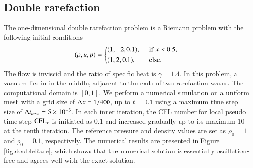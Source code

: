 


\subsection{Double rarefaction}

The one-dimensional double rarefaction problem \cite{hu2004kineticDoubleRare}
is a Riemann problem with the following initial conditions
\begin{equation}
    (\rho,u,p) = \begin{dcases}
        (1,-2,0.1),\ \  & \mathrm{if} \ x < 0.5,       \\
        (1,2,0.1),\ \   & \mathrm{else}.
    \end{dcases}
\end{equation}
The flow is inviscid and the ratio of specific heat is $\gamma=1.4$.
In this problem, a vacuum lies in in the middle, adjacent to the ends of two rarefaction waves.
The computational domain is $[0,1]$.
We perform a numerical simulation on a uniform mesh with a grid size of $\mathrm\Delta x = 1/400$, up to $t=0.1$ using a maximum time step size of $\mathrm\Delta t_{max}= 5 \times 10 ^{-3}$.
In each inner iteration, the CFL number for local pseudo time step $\text{CFL}_\tau$ is initiated as $0.1$ and
increased gradually up to its maximum $10$ at the tenth iteration.
The reference pressure and density values are set as $\rho_0=1$ and $p_0=0.1$, respectively.
The numerical results are presented in Figure \ref{fig:doubleRare}, which shows that the numerical solution is essentially oscillation-free and agrees well with the exact solution.

